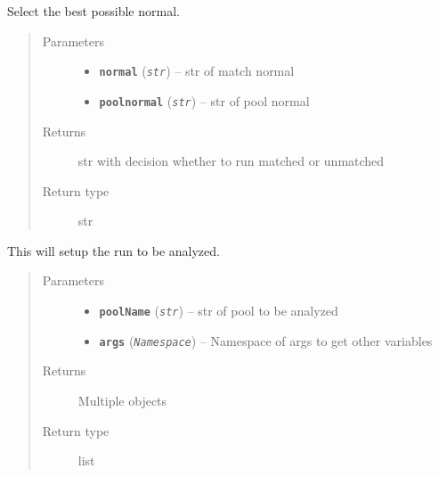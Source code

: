 \documentclass[letterpaper,10pt,english]{sphinxmanual}
\begin{document}
\begin{fulllineitems}
\label{iCallSV:iCallSV.iCallSV_dmp_wrapper.SelectNormal}
Select the best possible normal.
\begin{quote}\begin{description}
\item[{Parameters}] \leavevmode\begin{itemize}
\item {} 
\textbf{\texttt{normal}} (\emph{\texttt{str}}) -- str of match normal

\item {} 
\textbf{\texttt{poolnormal}} (\emph{\texttt{str}}) -- str of pool normal

\end{itemize}

\item[{Returns}] \leavevmode
str with decision whether to run matched or unmatched

\item[{Return type}] \leavevmode
str

\end{description}\end{quote}

\end{fulllineitems}


\begin{fulllineitems}
\label{iCallSV:iCallSV.iCallSV_dmp_wrapper.SetupRun}
This will setup the run to be analyzed.
\begin{quote}\begin{description}
\item[{Parameters}] \leavevmode\begin{itemize}
\item {} 
\textbf{\texttt{poolName}} (\emph{\texttt{str}}) -- str of pool to be analyzed

\item {} 
\textbf{\texttt{args}} (\emph{\texttt{Namespace}}) -- Namespace of args to get other variables

\end{itemize}

\item[{Returns}] \leavevmode
Multiple objects

\item[{Return type}] \leavevmode
list

\end{description}\end{quote}

\end{fulllineitems}
\end{document}
